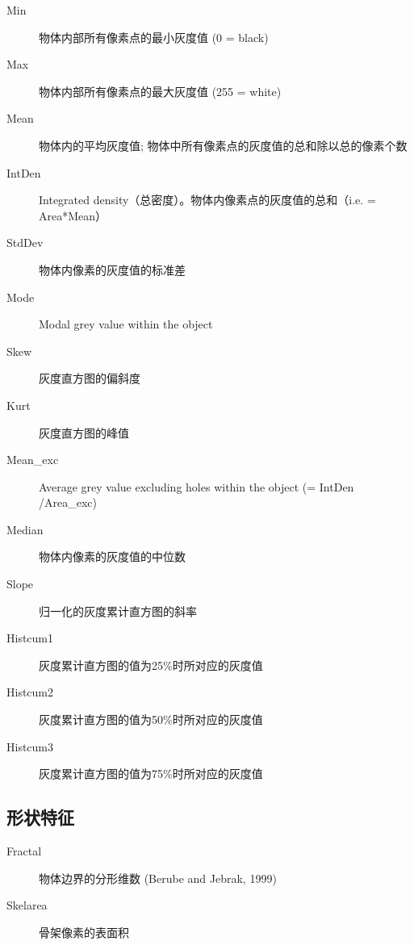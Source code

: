 \documentclass[12pt]{article}
\begin{document}
\begin{description}
\item[Min] 物体内部所有像素点的最小灰度值 (0 = black)
\item[Max] 物体内部所有像素点的最大灰度值 (255 = white)
\item[Mean] 物体内的平均灰度值; 物体中所有像素点的灰度值的总和除以总的像素个数
\item[IntDen] Integrated density（总密度）。物体内像素点的灰度值的总和（i.e. = Area*Mean）
\item[StdDev] 物体内像素的灰度值的标准差
\item[Mode] Modal grey value within the object
\item[Skew] 灰度直方图的偏斜度
\item[Kurt] 灰度直方图的峰值 
\item[Mean\_exc] Average grey value excluding holes within the object (= IntDen /Area\_exc)
\item[Median] 物体内像素的灰度值的中位数
\item[Slope] 归一化的灰度累计直方图的斜率
\item[Histcum1] 灰度累计直方图的值为25\%时所对应的灰度值
\item[Histcum2] 灰度累计直方图的值为50\%时所对应的灰度值
\item[Histcum3] 灰度累计直方图的值为75\%时所对应的灰度值
\end{description}

\subsection{形状特征}
\begin{description}
\item[Fractal] 物体边界的分形维数 (Berube and Jebrak, 1999)
\item[Skelarea] 骨架像素的表面积
\end{description}
\end{document}
